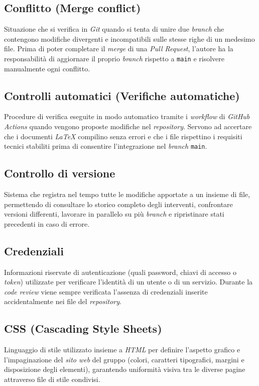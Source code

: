 \documentclass[11pt, a4paper]{article}
\begin{document}
\subsection*{Conflitto (Merge conflict)}
Situazione che si verifica in \textit{Git} quando si tenta di unire due \textit{branch} che contengono modifiche divergenti e incompatibili sulle stesse righe di un medesimo file. Prima di poter completare il \textit{merge} di una \textit{Pull Request}, l'autore ha la responsabilità di aggiornare il proprio \textit{branch} rispetto a \texttt{main} e risolvere manualmente ogni conflitto.

\subsection*{Controlli automatici (Verifiche automatiche)}
Procedure di verifica eseguite in modo automatico tramite i \textit{workflow} di \textit{GitHub Actions} quando vengono proposte modifiche nel \textit{repository}. Servono ad accertare che i documenti \textit{LaTeX} compilino senza errori e che i file rispettino i requisiti tecnici stabiliti prima di consentire l'integrazione nel \textit{branch} \texttt{main}.

\subsection*{Controllo di versione}
Sistema che registra nel tempo tutte le modifiche apportate a un insieme di file, permettendo di consultare lo storico completo degli interventi, confrontare versioni differenti, lavorare in parallelo su più \textit{branch} e ripristinare stati precedenti in caso di errore.

\subsection*{Credenziali}
Informazioni riservate di autenticazione (quali password, chiavi di accesso o \textit{token}) utilizzate per verificare l'identità di un utente o di un servizio. Durante la \textit{code review} viene sempre verificata l'assenza di credenziali inserite accidentalmente nei file del \textit{repository}.

\subsection*{CSS (Cascading Style Sheets)}
Linguaggio di stile utilizzato insieme a \textit{HTML} per definire l'aspetto grafico e l'impaginazione del \textit{sito web} del gruppo (colori, caratteri tipografici, margini e disposizione degli elementi), garantendo uniformità visiva tra le diverse pagine attraverso file di stile condivisi.
\end{document}
